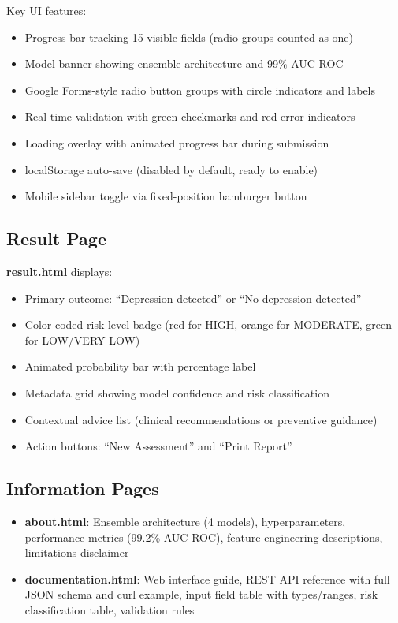 \documentclass[11pt,a4paper]{article}
\begin{document}
Key UI features:
\begin{itemize}[nosep]
    \item Progress bar tracking 15 visible fields (radio groups counted as one)
    \item Model banner showing ensemble architecture and 99\% AUC-ROC
    \item Google Forms-style radio button groups with circle indicators and labels
    \item Real-time validation with green checkmarks and red error indicators
    \item Loading overlay with animated progress bar during submission
    \item localStorage auto-save (disabled by default, ready to enable)
    \item Mobile sidebar toggle via fixed-position hamburger button
\end{itemize}

\subsection{Result Page}

\textbf{result.html} displays:
\begin{itemize}[nosep]
    \item Primary outcome: ``Depression detected'' or ``No depression detected''
    \item Color-coded risk level badge (red for HIGH, orange for MODERATE, green for LOW/VERY LOW)
    \item Animated probability bar with percentage label
    \item Metadata grid showing model confidence and risk classification
    \item Contextual advice list (clinical recommendations or preventive guidance)
    \item Action buttons: ``New Assessment'' and ``Print Report''
\end{itemize}

\subsection{Information Pages}

\begin{itemize}[nosep]
    \item \textbf{about.html}: Ensemble architecture (4 models), hyperparameters, performance metrics (99.2\% AUC-ROC), feature engineering descriptions, limitations disclaimer
    \item \textbf{documentation.html}: Web interface guide, REST API reference with full JSON schema and curl example, input field table with types/ranges, risk classification table, validation rules
\end{itemize}
\end{document}
